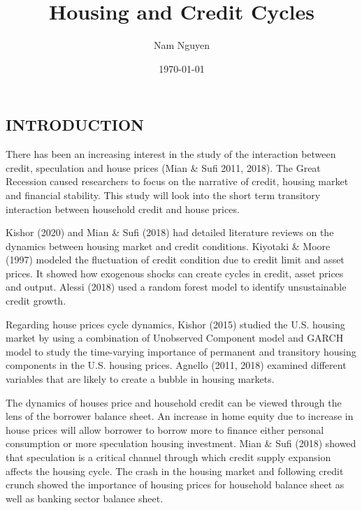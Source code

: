 \documentclass[12pt]{article}
\title{Housing and Credit Cycles}
\author{Nam Nguyen}
\date{\today}
\begin{document}
	\maketitle
	
	\begin{outline}[enumerate]
		
		\section{INTRODUCTION}
	
		There has been an increasing interest in the study of the interaction between credit, speculation and house prices (Mian \& Sufi 2011, 2018). The Great Recession caused researchers to focus on the narrative of credit, housing market and financial stability. This study will look into the short term transitory interaction between household credit and house prices.
		
		Kishor (2020) and Mian \& Sufi (2018) had detailed literature reviews on the dynamics between housing market and credit conditions. Kiyotaki \& Moore (1997) modeled the fluctuation of credit condition due to credit limit and asset prices. It showed how exogenous shocks can create cycles in credit, asset prices and output. Alessi (2018) used a random forest model to identify unsustainable credit growth.
		
		Regarding house prices cycle dynamics, Kishor (2015) studied the U.S. housing market by using a combination of Unobserved Component model and GARCH model to study the time-varying importance of permanent and transitory housing components in the U.S. housing prices. Agnello (2011, 2018) examined different variables that are likely to create a bubble in housing markets.
		
		The dynamics of houses price and household credit can be viewed through the lens of the borrower balance sheet. An increase in home equity due to increase in house prices will allow borrower to borrow more to finance either personal consumption or more speculation housing investment. Mian \& Sufi (2018) showed that speculation  is a critical channel through which credit supply expansion affects the housing cycle. The crash in the housing market and following credit crunch showed the importance of housing prices for household balance sheet as well as banking sector balance sheet.
		

\end{outline}
\end{document}
